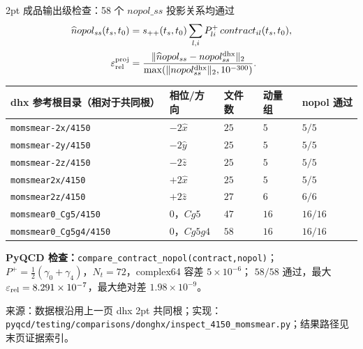 \documentclass[UTF8,aspectratio=169,11pt]{ctexbeamer}
\newcommand{\source}[1]{\vspace{0.05em}\par{\raggedright\scriptsize\color{muted}来源：#1\par}}
\newcommand{\codepath}[1]{\nolinkurl{#1}}
\begin{document}
\begin{frame}[t]{2pt 成品输出级检查：58 个 $nopol\_ss$ 投影关系均通过}
  \footnotesize
  \begin{align*}
    \widehat nopol_{ss}(t_s,t_0)&=s_{++}(t_s,t_0)
      \sum_{l,i}P^+_{li}\,contract_{il}(t_s,t_0),\\
    \varepsilon_{\rm rel}^{\rm proj}&=
      \frac{\|\widehat nopol_{ss}-nopol_{ss}^{\rm dhx}\|_2}
      {\max(\|nopol_{ss}^{\rm dhx}\|_2,10^{-300})}.
  \end{align*}
  \begin{tabularx}{0.96\textwidth}{@{}Y P{0.13\textwidth} P{0.10\textwidth} P{0.10\textwidth} P{0.14\textwidth}@{}}
    \toprule
    dhx 参考根目录（相对于共同根） & 相位/方向 & 文件数 & 动量组 & nopol 通过 \\
    \midrule
    \codepath{momsmear-2x/4150} & $-2\hat x$ & $25$ & $5$ & $5/5$ \\
    \codepath{momsmear-2y/4150} & $-2\hat y$ & $25$ & $5$ & $5/5$ \\
    \codepath{momsmear-2z/4150} & $-2\hat z$ & $25$ & $5$ & $5/5$ \\
    \codepath{momsmear2x/4150} & $+2\hat x$ & $25$ & $5$ & $5/5$ \\
    \codepath{momsmear2z/4150} & $+2\hat z$ & $27$ & $6$ & $6/6$ \\
    \codepath{momsmear0_Cg5/4150} & $0$，$Cg5$ & $47$ & $16$ & $16/16$ \\
    \codepath{momsmear0_Cg5g4/4150} & $0$，$Cg5g4$ & $58$ & $16$ & $16/16$ \\
    \bottomrule
  \end{tabularx}
  \par\vspace{0.12em}
  {\scriptsize
  \textbf{PyQCD 检查：}\codepath{compare_contract_nopol(contract,nopol)}；
  $P^+=\frac12(\gamma_0+\gamma_4)$，$N_t=72$，complex64 容差 $5\times10^{-6}$；
  $58/58$ 通过，最大 $\varepsilon_{\rm rel}=8.291\times10^{-7}$，最大绝对差 $1.98\times10^{-9}$。\par}
  \source{数据根沿用上一页 dhx 2pt 共同根；实现：\codepath{pyqcd/testing/comparisons/donghx/inspect_4150_momsmear.py}；结果路径见末页证据索引。}
\end{frame}
\end{document}
